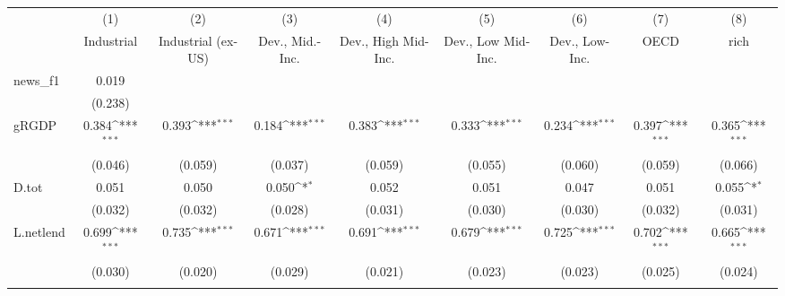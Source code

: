 {
\def\sym#1{\ifmmode^{#1}\else\(^{#1}\)\fi}
\begin{tabular}{l*{8}{c}}
\toprule
            &\multicolumn{1}{c}{(1)}&\multicolumn{1}{c}{(2)}&\multicolumn{1}{c}{(3)}&\multicolumn{1}{c}{(4)}&\multicolumn{1}{c}{(5)}&\multicolumn{1}{c}{(6)}&\multicolumn{1}{c}{(7)}&\multicolumn{1}{c}{(8)}\\
            &\multicolumn{1}{c}{Industrial}&\multicolumn{1}{c}{Industrial (ex-US)}&\multicolumn{1}{c}{Dev., Mid.-Inc.}&\multicolumn{1}{c}{Dev., High Mid-Inc.}&\multicolumn{1}{c}{Dev., Low Mid-Inc.}&\multicolumn{1}{c}{Dev., Low-Inc.}&\multicolumn{1}{c}{OECD}&\multicolumn{1}{c}{rich}\\
\midrule
news\_f1     &       0.019         &                     &                     &                     &                     &                     &                     &                     \\
            &     (0.238)         &                     &                     &                     &                     &                     &                     &                     \\
\addlinespace
gRGDP       &       0.384\sym{***}&       0.393\sym{***}&       0.184\sym{***}&       0.383\sym{***}&       0.333\sym{***}&       0.234\sym{***}&       0.397\sym{***}&       0.365\sym{***}\\
            &     (0.046)         &     (0.059)         &     (0.037)         &     (0.059)         &     (0.055)         &     (0.060)         &     (0.059)         &     (0.066)         \\
\addlinespace
D.tot       &       0.051         &       0.050         &       0.050\sym{*}  &       0.052         &       0.051         &       0.047         &       0.051         &       0.055\sym{*}  \\
            &     (0.032)         &     (0.032)         &     (0.028)         &     (0.031)         &     (0.030)         &     (0.030)         &     (0.032)         &     (0.031)         \\
\addlinespace
L.netlend   &       0.699\sym{***}&       0.735\sym{***}&       0.671\sym{***}&       0.691\sym{***}&       0.679\sym{***}&       0.725\sym{***}&       0.702\sym{***}&       0.665\sym{***}\\
            &     (0.030)         &     (0.020)         &     (0.029)         &     (0.021)         &     (0.023)         &     (0.023)         &     (0.025)         &     (0.024)         \\
\addlinespace

\end{tabular}}
